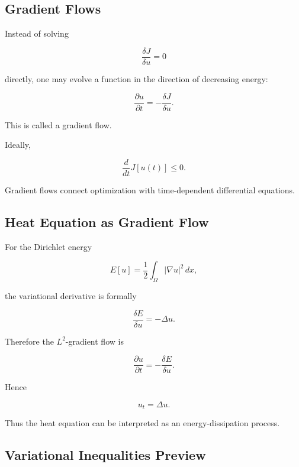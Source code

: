 \subsection{Gradient Flows}
\label{subsec:gradient-flows}

Instead of solving

\[
\frac{\delta J}{\delta u}=0
\]

directly, one may evolve a function in the direction of decreasing
energy:

\[
\boxed{
\frac{\partial u}{\partial t}
=
-
\frac{\delta J}{\delta u}.
}
\]

This is called a gradient flow.

Ideally,

\[
\boxed{
\frac{d}{dt}J[u(t)]
\leq0.
}
\]

Gradient flows connect optimization with time-dependent differential
equations.

\subsection{Heat Equation as Gradient Flow}
\label{subsec:heat-gradient-flow}

For the Dirichlet energy

\[
E[u]
=
\frac12
\int_\Omega
|\nabla u|^2\,dx,
\]

the variational derivative is formally

\[
\boxed{
\frac{\delta E}{\delta u}
=
-\Delta u.
}
\]

Therefore the \(L^2\)-gradient flow is

\[
\frac{\partial u}{\partial t}
=
-\frac{\delta E}{\delta u}.
\]

Hence

\[
\boxed{
u_t=\Delta u.
}
\]

Thus the heat equation can be interpreted as an energy-dissipation
process.

\subsection{Variational Inequalities Preview}
\label{subsec:variational-inequalities-preview}

